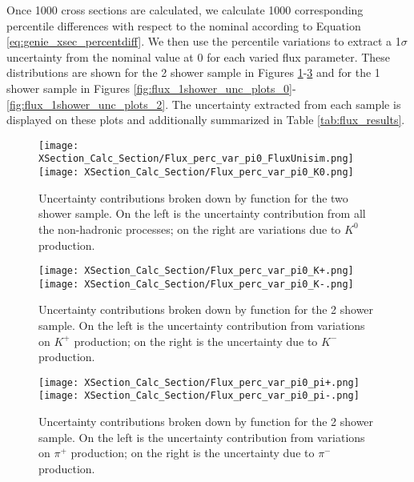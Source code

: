 
Once 1000 cross sections are calculated, we calculate 1000 corresponding percentile differences with respect to the nominal according to Equation \ref{eq:genie_xsec_percentdiff}. We then use the percentile variations to extract a 1$\sigma$ uncertainty from the nominal value at 0 for each varied flux parameter.  These distributions are shown for the 2 shower sample in Figures \ref{fig:flux_2shower_unc_plots_0}-\ref{fig:flux_2shower_unc_plots_2} and for the 1 shower sample in Figures \ref{fig:flux_1shower_unc_plots_0}-\ref{fig:flux_1shower_unc_plots_2}. The uncertainty extracted from each sample is displayed on these plots and additionally summarized in Table \ref{tab:flux_results}.  


\begin{figure}[H]
\centering
\texttt{[image: XSection\_Calc\_Section/Flux\_perc\_var\_pi0\_FluxUnisim.png]}
\texttt{[image: XSection\_Calc\_Section/Flux\_perc\_var\_pi0\_K0.png]}
\caption{ Uncertainty contributions broken down by function for the two shower sample. On the left is the uncertainty contribution from all the non-hadronic processes; on the right are variations due to $K^0$ production. }
\label{fig:flux_2shower_unc_plots_0}
\end{figure}

\begin{figure}[H]
\centering
\texttt{[image: XSection\_Calc\_Section/Flux\_perc\_var\_pi0\_K+.png]}
\texttt{[image: XSection\_Calc\_Section/Flux\_perc\_var\_pi0\_K-.png]}
\caption{ Uncertainty contributions broken down by function for the 2 shower sample. On the left is the uncertainty contribution from variations on $K^+$ production; on the right is the uncertainty due to $K^-$ production. }
\label{fig:flux_2shower_unc_plots_1}
\end{figure}

\begin{figure}[H]
\centering
\texttt{[image: XSection\_Calc\_Section/Flux\_perc\_var\_pi0\_pi+.png]}
\texttt{[image: XSection\_Calc\_Section/Flux\_perc\_var\_pi0\_pi-.png]}
\caption{ Uncertainty contributions broken down by function for the 2 shower sample. On the left is the uncertainty contribution from variations on $\pi^+$ production; on the right is the uncertainty due to $\pi^-$ production. }
\label{fig:flux_2shower_unc_plots_2}
\end{figure}


